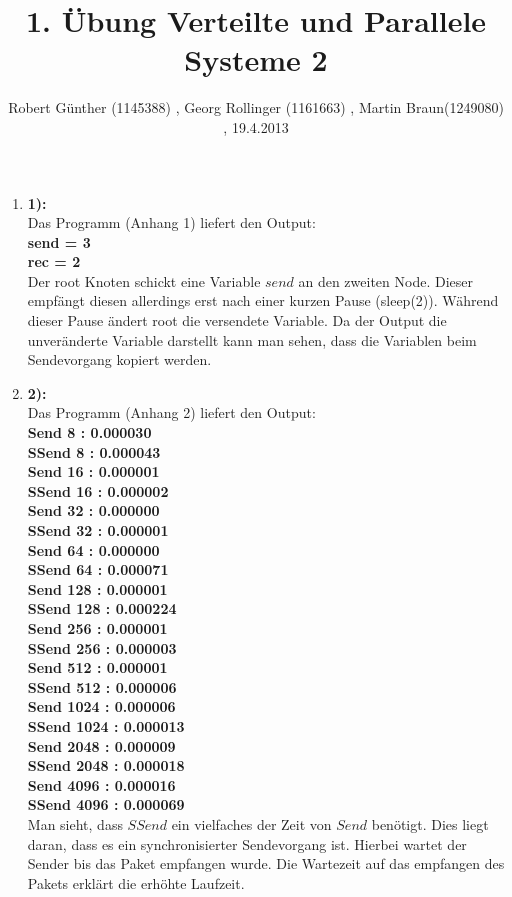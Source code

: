 \documentclass[10pt,a4paper]{article}
\title{1. Übung Verteilte und Parallele Systeme 2}
\author{ Robert Günther (1145388) , Georg Rollinger (1161663) , Martin Braun(1249080) , 19.4.2013}
\date{}
\begin{document}
\maketitle
\begin{enumerate}

\item[]{\textbf{1):} \\
   Das Programm (Anhang 1) liefert den Output:\\
   \textbf{
   send = 3\\
	rec = 2}\\
	Der root Knoten schickt eine Variable $send$ an den zweiten Node. Dieser empfängt diesen allerdings erst nach einer kurzen Pause (sleep(2)). Während dieser Pause ändert root die versendete Variable. Da der Output die unveränderte Variable darstellt kann man sehen, dass die Variablen beim Sendevorgang kopiert werden.
}
\item[]{\textbf{2):} \\
	Das Programm (Anhang 2) liefert den Output:\\
	\textbf{
	Send 8 : 0.000030\\
	SSend 8 : 0.000043\\
	Send 16 : 0.000001\\
	SSend 16 : 0.000002\\
	Send 32 : 0.000000\\
	SSend 32 : 0.000001\\
	Send 64 : 0.000000\\
	SSend 64 : 0.000071\\
	Send 128 : 0.000001\\
	SSend 128 : 0.000224\\
	Send 256 : 0.000001\\
	SSend 256 : 0.000003\\
	Send 512 : 0.000001\\
	SSend 512 : 0.000006\\
	Send 1024 : 0.000006\\
	SSend 1024 : 0.000013\\
	Send 2048 : 0.000009\\
	SSend 2048 : 0.000018\\
	Send 4096 : 0.000016\\
	SSend 4096 : 0.000069\\
	}
Man sieht, dass $SSend$ ein vielfaches der Zeit von $Send$ benötigt. Dies liegt daran, dass es ein synchronisierter Sendevorgang ist. Hierbei wartet der Sender bis das Paket empfangen wurde. Die Wartezeit auf das empfangen des Pakets erklärt die erhöhte Laufzeit.
}


\end{enumerate}
\end{document}
